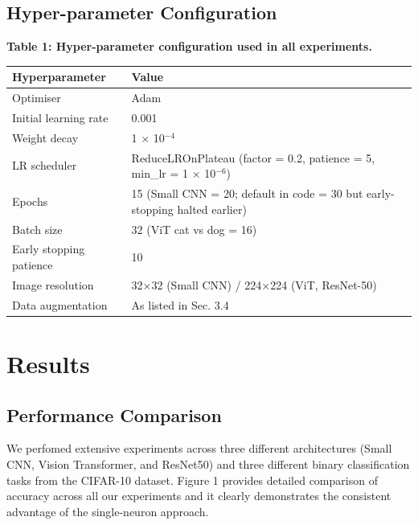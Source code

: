 \documentclass[11pt]{article}
\begin{document}
\subsection{Hyper-parameter Configuration}
\textbf{Table 1: Hyper-parameter configuration used in all experiments.}

\begin{tabular}{ll}
\hline
Hyperparameter & Value \\
\hline
Optimiser & Adam \\
Initial learning rate & 0.001 \\
Weight decay & 1 × 10$^{-4}$ \\
LR scheduler & ReduceLROnPlateau (factor = 0.2, patience = 5, min\_lr = 1 × 10$^{-6}$) \\
Epochs & 15 (Small CNN = 20; default in code = 30 but early-stopping halted earlier) \\
Batch size & 32 (ViT cat vs dog = 16) \\
Early stopping patience & 10 \\
Image resolution & 32×32 (Small CNN) / 224×224 (ViT, ResNet-50) \\
Data augmentation & As listed in Sec. 3.4 \\
\hline
\end{tabular}



\section{Results}
\subsection{Performance Comparison}
We perfomed extensive experiments across three different architectures (Small CNN, Vision Transformer, and ResNet50) and three different binary classification tasks from the CIFAR-10 dataset. Figure 1 provides detailed comparison of accuracy across all our experiments and it clearly demonstrates the consistent advantage of the single-neuron approach.
\end{document}
